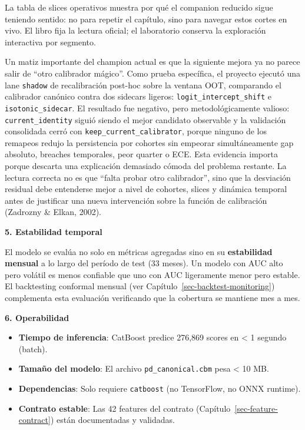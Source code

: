 \documentclass[
  spanish,
  11pt,
  letterpaper,
]{scrbook}
\providecommand{\tightlist}{%
  \setlength{\itemsep}{0pt}\setlength{\parskip}{0pt}}
\theoremstyle{plain}
\theoremstyle{remark}
\begin{document}
La tabla de slices operativos muestra por qué el companion reducido
sigue teniendo sentido: no para repetir el capítulo, sino para navegar
estos cortes en vivo. El libro fija la lectura oficial; el laboratorio
conserva la exploración interactiva por segmento.

Un matiz importante del champion actual es que la siguiente mejora ya no
parece salir de ``otro calibrador mágico''. Como prueba específica, el
proyecto ejecutó una lane \texttt{shadow} de recalibración post-hoc
sobre la ventana OOT, comparando el calibrador canónico contra dos
sidecars ligeros: \texttt{logit\_intercept\_shift} e
\texttt{isotonic\_sidecar}. El resultado fue negativo, pero
metodológicamente valioso: \texttt{current\_identity} siguió siendo el
mejor candidato observable y la validación consolidada cerró con
\texttt{keep\_current\_calibrator}, porque ninguno de los remapeos
redujo la persistencia por cohortes sin empeorar simultáneamente gap
absoluto, breaches temporales, peor quarter o ECE. Esta evidencia
importa porque descarta una explicación demasiado cómoda del problema
restante. La lectura correcta no es que ``falta probar otro
calibrador'', sino que la desviación residual debe entenderse mejor a
nivel de cohortes, slices y dinámica temporal antes de justificar una
nueva intervención sobre la función de calibración (Zadrozny \& Elkan,
2002).

\textbf{5. Estabilidad temporal}

El modelo se evalúa no solo en métricas agregadas sino en su
\textbf{estabilidad mensual} a lo largo del período de test (33 meses).
Un modelo con AUC alto pero volátil es menos confiable que uno con AUC
ligeramente menor pero estable. El backtesting conformal mensual (ver
Capítulo~\ref{sec-backtest-monitoring}) complementa esta evaluación
verificando que la cobertura se mantiene mes a mes.

\textbf{6. Operabilidad}

\begin{itemize}
\tightlist
\item
  \textbf{Tiempo de inferencia}: CatBoost predice 276,869 scores en
  \textless{} 1 segundo (batch).
\item
  \textbf{Tamaño del modelo}: El archivo \texttt{pd\_canonical.cbm} pesa
  \textless{} 10 MB.
\item
  \textbf{Dependencias}: Solo requiere \texttt{catboost} (no TensorFlow,
  no ONNX runtime).
\item
  \textbf{Contrato estable}: Las 42 features del contrato
  (Capítulo~\ref{sec-feature-contract}) están documentadas y validadas.
\end{itemize}
\end{document}
